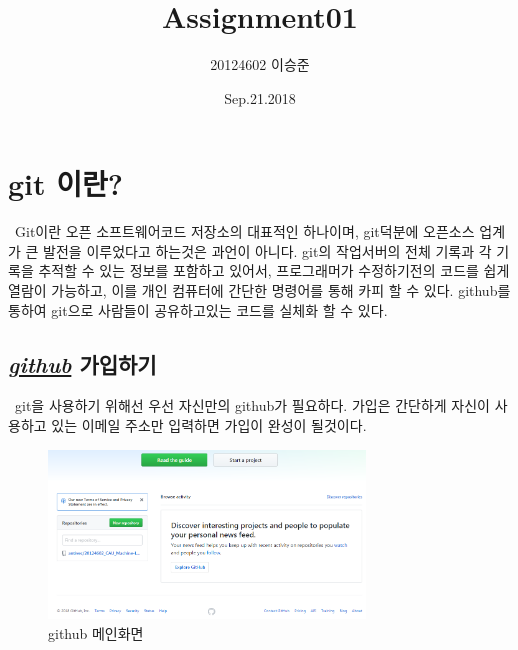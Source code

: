 \documentclass[12pt]{article}
\title{Assignment01}
\author{20124602 이승준}
\date{Sep.21.2018}
\begin{document}
  \maketitle
  \section[시작]{git 이란?}
  	\ Git이란 오픈 소프트웨어코드 저장소의 대표적인 하나이며, git덕분에 오픈소스 업계가 큰 발전을 이루었다고 하는것은 과언이 아니다. git의 작업서버의 전체 기록과 각 기록을 추적할 수 있는 정보를 포함하고 있어서, 프로그래머가 수정하기전의 코드를 쉽게 열람이 가능하고, 이를 개인 컴퓨터에 간단한 명령어를 통해 카피 할 수 있다. github를 통하여 git으로 사람들이 공유하고있는 코드를 실체화 할 수 있다.

    
  \subsection{ \textit{\href{https://git-scm.com/download/win}{github}} 가입하기}
  \ git을 사용하기 위해선 우선 자신만의 github가 필요하다. 	
  	가입은 간단하게 자신이 사용하고 있는 이메일 주소만 입력하면 가입이 완성이 될것이다.
   \begin{figure}[!hbp]
   	\centering   
   	\label{github main}
   	\includegraphics[width=0.75\textwidth]{main_github}
   	\caption{github 메인화면}
   \end{figure}
\end{document}
